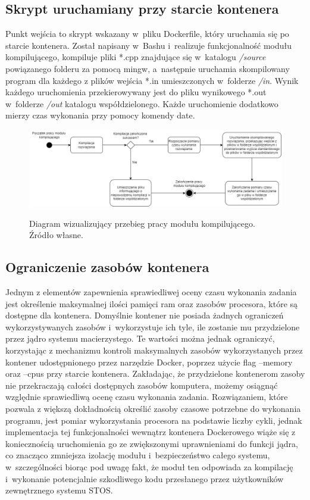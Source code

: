 \subsection{Skrypt uruchamiany przy starcie kontenera}
Punkt wejścia to skrypt wskazany w~pliku Dockerfile, który uruchamia się po starcie kontenera. Został napisany w~Bashu i~realizuje funkcjonalność modułu kompilującego, kompiluje pliki *.cpp znajdujące się w~katalogu \textit{/source} powiązanego folderu za pomocą mingw, a~następnie uruchamia skompilowany program dla każdego z plików wejścia *.in umieszczonych w~folderze \textit{/in}. Wynik każdego uruchomienia przekierowywany jest do pliku wynikowego *.out w~folderze \textit{/out} katalogu współdzielonego. Każde uruchomienie dodatkowo mierzy czas wykonania przy pomocy komendy date.
\begin{figure}[!ht]
	\begin{center}
		\resizebox{1\textwidth}{!} {
			\includegraphics{img/3/diagram-aktywnosci-modul-kompilujacy.png}
		}
		\caption[Diagram aktywności modułu kompilującego]{Diagram wizualizujący przebieg pracy modułu kompilującego. Źródło własne.}
		\label{diagram-aktywnosci-worker}
	\end{center}
\end{figure}

\subsection{Ograniczenie zasobów kontenera}
Jednym z elementów zapewnienia sprawiedliwej oceny czasu wykonania zadania jest określenie maksymalnej ilości pamięci ram oraz zasobów procesora, które są dostępne dla kontenera. Domyślnie kontener nie posiada żadnych ograniczeń wykorzystywanych zasobów i~wykorzystuje ich tyle, ile zostanie mu przydzielone przez jądro systemu macierzystego. Te wartości można jednak ograniczyć, korzystając z mechanizmu kontroli maksymalnych zasobów wykorzystanych przez kontener udostępnionego przez narzędzie Docker\cite{dockerConstraints}, poprzez użycie flag --memory oraz --cpus przy starcie kontenera. Zakładając, że przydzielone kontenerom zasoby nie przekraczają całości dostępnych zasobów komputera, możemy osiągnąć względnie sprawiedliwą ocenę czasu wykonania zadania. Rozwiązaniem, które pozwala z większą dokładnością określić zasoby czasowe potrzebne do wykonania programu, jest pomiar wykorzystania procesora na podstawie liczby cykli, jednak implementacja tej funkcjonalności wewnątrz kontenera Dockerowego wiąże się z koniecznością uruchomienia go ze zwiększonymi uprawnieniami do funkcji jądra, co znacząco zmniejsza izolację modułu i~bezpieczeństwo całego systemu, w~szczególności biorąc pod uwagę fakt, że moduł ten odpowiada za kompilację i~wykonanie potencjalnie szkodliwego kodu przesłanego przez użytkowników zewnętrznego systemu STOS.

